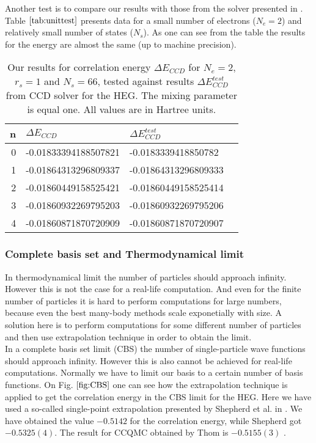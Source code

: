 Another test is to compare our results with those from the solver presented in \cite{hjorth-jensenAdvancedCourseComputational2017}. Table $\ref{tab:unittest}$ presents data for a small number of electrons ($N_e=2$) and relatively small number of states ($N_s$). As one can see from the table the results for the energy are almost the same (up to machine precision).
\begin{table}[h]
	\centering

	\begin{tabular}{rlll}
		n & $\Delta E_{CCD}$     &   $\Delta E_{CCD}^{test}$  \\ \hline
		0 & -0.01833394188507821 & -0.0183339418850782  \\
		1 & -0.01864313296809337 & -0.01864313296809333 \\
		2 & -0.01860449158525421 & -0.01860449158525414 \\
		3 & -0.01860932269795203 & -0.01860932269795206 \\
		4 & -0.01860871870720909 & -0.01860871870720907 \\
	\end{tabular}
		\captionsetup{width=1\textwidth}
		\caption{Our results for correlation energy $\Delta E_{CCD}$  for $N_e=2$, $r_s=1$ and $N_s=66$,   tested against results  $\Delta E_{CCD}^{test}$ from \cite{hjorth-jensenAdvancedCourseComputational2017} CCD solver for the HEG. The mixing parameter is equal one. All values are in Hartree units.}
	\label{tab:unittest}
\end{table}
\subsubsection{Complete basis set and Thermodynamical limit}
In thermodynamical limit the number of particles should approach
infinity. However this is not the case for a real-life
computation. And even for the finite number of particles it is hard
to perform computations for large numbers, because even the best many-body
methods scale exponetially with size. A solution here is to perform
computations for some different number of particles and then use
extrapolation technique in order to obtain the limit.\\ In a complete
basis set limit (CBS) the number of single-particle wave functions
should approach infinity. However this is also cannot be achieved for
real-life computations. Normally we have to limit our basis to a
certain number of basis functions. On Fig. $\ref{fig:CBS}$ one can see
how the extrapolation technique is applied to get the
correlation energy in the CBS limit for the HEG. Here we have used a
so-called single-point extrapolation presented by Shepherd et al. in
\cite{shepherdInvestigationFullConfiguration2012}. We have obtained
the value $-0.5142$ for the correlation energy, while Shepherd got
$-0.5325(4)$. The result for CCQMC obtained by Thom is $-0.5155(3)$
\cite{spencerDevelopmentsStochasticCoupled2016}.

